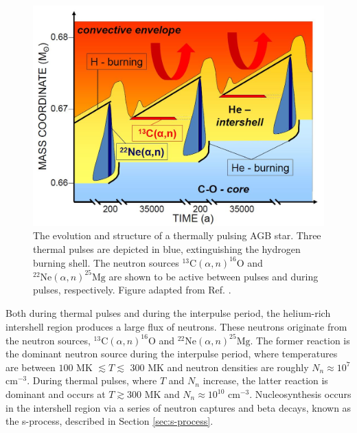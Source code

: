 
\begin{figure}[t]
\centering
\includegraphics[width=6.5in]{Chapter-1/figs/sProcess_AGB.JPG}
\caption{\label{fig:AGB_Structure}The evolution and structure of a thermally pulsing AGB star. Three thermal pulses are depicted in blue, extinguishing the hydrogen burning shell. The neutron sources $^{13}\mathrm{C}(\alpha,n)^{16}\mathrm{O}$ and $^{22}\mathrm{Ne}(\alpha,n)^{25}\mathrm{Mg}$ are shown to be active between pulses and during pulses, respectively. Figure adapted from Ref. \cite{Reifarth2014}.}
\end{figure}

Both during thermal pulses and during the interpulse period, the helium-rich intershell region produces a large flux of neutrons. These neutrons originate from the neutron sources, $^{13}\mathrm{C}(\alpha,n)^{16}\mathrm{O}$ and $^{22}\mathrm{Ne}(\alpha,n)^{25}\mathrm{Mg}$. The former reaction is the dominant neutron source during the interpulse period, where temperatures are between $100$ MK $\lesssim T \lesssim$ 300 MK and neutron densities are roughly $N_{n} \approx 10^{7}$ $\mathrm{cm}^{-3}$. During thermal pulses, where $T$ and $N_{n}$ increase, the latter reaction is dominant and occurs at $T \gtrsim 300$ MK and $N_{n} \approx 10^{10}$ $\mathrm{cm}^{-3}$. Nucleosynthesis occurs in the intershell region via a series of neutron captures and beta decays, known as the s-process, described in Section \ref{sec:s-process}.

